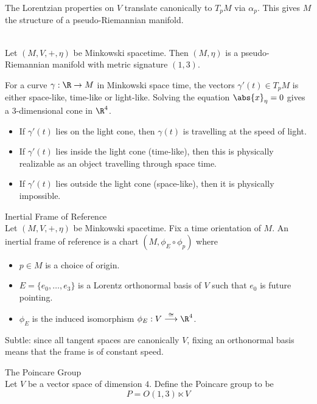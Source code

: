 \documentclass[a4paper]{article}
\begin{document}
The Lorentzian properties on $V$ translate canonically to $T_pM$ via $\alpha_p$. This gives $M$ the structure of a pseudo-Riemannian manifold. 

\begin{prp}{}{}\\
Let $(M,V,+,\eta)$ be Minkowski spacetime. Then $(M,\eta)$ is a pseudo-Riemannian manifold with metric signature $(1,3)$. 
\end{prp}

For a curve $\gamma:\R\to M$ in Minkowski space time, the vectors $\gamma'(t)\in T_pM$ is either space-like, time-like or light-like. Solving the equation $\abs{x}_\eta=0$ gives a $3$-dimensional cone in $\R^4$. 
\begin{itemize}
\item If $\gamma'(t)$ lies on the light cone, then $\gamma(t)$ is travelling at the speed of light. 
\item If $\gamma'(t)$ lies inside the light cone (time-like), then this is physically realizable as an object travelling through space time. 
\item If $\gamma'(t)$ lies outside the light cone (space-like), then it is physically impossible. 
\end{itemize}

\begin{defn}{Inertial Frame of Reference}{}\\
Let $(M,V,+,\eta)$ be Minkowski spacetime. Fix a time orientation of $M$. An inertial frame of reference is a chart $(M,\phi_E\circ\phi_p)$ where
\begin{itemize}
\item $p\in M$ is a choice of origin. 
\item$E=\{e_0,\dots,e_3\}$ is a Lorentz orthonormal basis of $V$ such that $e_0$ is future pointing. 
\item $\phi_E$ is the induced isomorphism $\phi_E:V\overset{\cong}{\longrightarrow}\R^4$. 
\end{itemize}
\end{defn}

Subtle: since all tangent spaces are canonically $V$, fixing an orthonormal basis means that the frame is of constant speed. 

\begin{defn}{The Poincare Group}{}\\
Let $V$ be a vector space of dimension $4$. Define the Poincare group to be $$P=O(1,3)\ltimes V$$
\end{defn}
\end{document}

